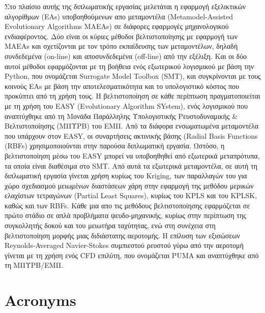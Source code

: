 \documentclass[twoside, 12pt,notitlepage]{report}
\begin{document}
Στο πλαίσιο αυτής της διπλωματικής εργασίας μελετάται η 
εφαρμογή εξελικτικών αλγορίθμων (EAs) υποβοηθούμενων απο 
μεταμοντέλα (Metamodel-Assisted Evolutionary Algorithms MAEAs) σε 
διάφορες εφαρμογές μηχανολογικού ενδιαφέροντος. Δύο είναι οι κύριες 
μέθοδοι βελτιστοποίησης με εφαρμογή των MAEAs και σχετίζονται με 
τον τρόπο εκπαίδευσης των μεταμοντέλων, δηλαδή συνδεδεμένα (on-line) 
και αποσυνδεδεμένα (off-line) από την εξέλιξη. Και οι δύο αυτοί 
μέθοδοι εφαρμόζονται με τη βοήθεια ενός εξωτερικού λογισμικού με 
βάση την Python, που ονομάζεται Surrogate Model Toolbox (SMT), και 
συγκρίνονται με τους κοινούς ΕΑs με βάση την αποτελεσματικότητα και 
το υπολογιστικό κόστος που προκύπτει από τη χρήση τους. Η 
βελτιστοποίηση σε κάθε περίπτωση πραγματοποιείται με τη χρήση του 
EASY (Evolutionary Algorithm SYstem), ενός λογισμικού που 
αναπτύχθηκε από τη Μονάδα Παράλληλης Υπολογιστικής Ρευστοδυναμικής 
\& Βελτιστοποίησης (ΜΠΥΡΒ) του ΕΜΠ. Από τα διάφορα ενσωματωμένα 
μεταμοντέλα που υπάρχουν στον EASY, οι συναρτήσεις ακτινικής 
βάσης (Radial Basis Functions (RBFs) χρησιμοποιούνται στην παρούσα 
διπλωματική εργασία. Ωστόσο, η βελτιστοποίηση μέσω του EASY 
μπορεί να υποβοηθηθεί από εξωτερικά μεταπρότυπα, τα οποία είναι 
διαθέσιμα στο SMT. Από αυτά τα εξωτερικά μεταμοντέλα, σε αυτή τη 
διπλωματική εργασία γίνεται χρήση κυρίως του Kriging, των 
παραλλαγών του για χώρο σχεδιασμού μειωμένων διαστάσεων χάρη στην 
εφαρμογή της μεθόδου μερικών ελαχίστων τετραγώνων (Partial Least 
Squares), κυρίως του KPLS και του KPLSK, καθώς και των RBFs. Κάθε 
μια απο τις μεθόδους βελτιστοποίησης εφαρμόζεται σε πρώτο στάδιο σε 
απλά προβλήματα ψευδο-μηχανικής, κυρίως στην περίπτωση της 
συγκολλητής δοκού και του μειωτήρα ταχύτητας, ενώ στη 
συνέχεια στη βελτιστοποίηση μορφής μιας διδιάστατης αεροτομής. Η 
επίλυση των εξισώσεων Reynolds-Averaged Navier-Stokes συμπιεστού 
ρευστού γύρω από την αεροτομή γίνεται με τη χρήση ενός CFD επιλύτη, 
που ονομάζεται PUMA και αναπτύχθηκε από τη ΜΠΥΡΒ/ΕΜΠ.

\newpage

\chapter*{Acronyms}
\end{document}
